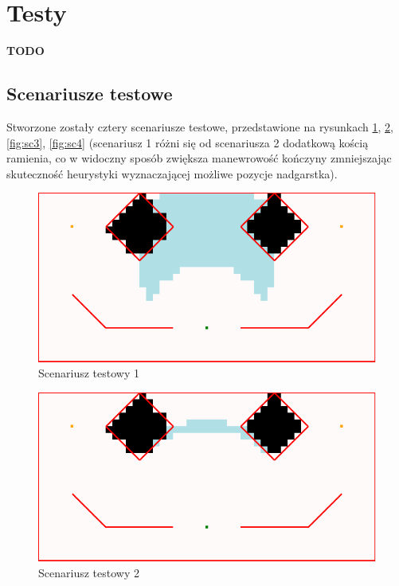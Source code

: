 \documentclass[11pt, leqno]{article}
\begin{document}
\section{Testy}

\textbf{TODO}

\subsection{Scenariusze testowe}
Stworzone zostały cztery scenariusze testowe, przedstawione na rysunkach \ref{fig:sc1}, \ref{fig:sc2}, \ref{fig:sc3}, \ref{fig:sc4} (scenariusz 1 różni się od scenariusza 2 dodatkową kością ramienia, co w widoczny sposób zwiększa manewrowość kończyny zmniejszając skuteczność heurystyki wyznaczającej możliwe pozycje nadgarstka).


\begin{figure}[h!]
	\centering
	\includegraphics[scale=0.4]{scenario1}
	\caption{Scenariusz testowy 1}
	\label{fig:sc1}
\end{figure}

\begin{figure}[h!]
	\centering
	\includegraphics[scale=0.4]{scenario2}
	\caption{Scenariusz testowy 2}
	\label{fig:sc2}
\end{figure}
\end{document}
